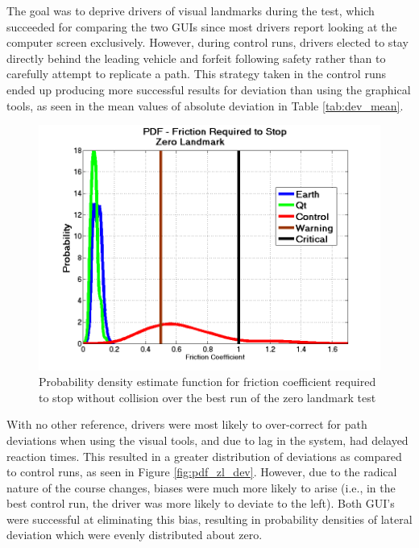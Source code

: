 \documentclass[twocolumn,10pt]{article}
\begin{document}
    The goal was to deprive drivers of visual landmarks during the test, which succeeded for comparing the two GUIs since most drivers report looking at the computer screen exclusively. However, during control runs, drivers elected to stay directly behind the leading vehicle and forfeit following safety rather than to carefully attempt to replicate a path. This strategy taken in the control runs ended up producing more successful results for deviation than using the graphical tools, as seen in the mean values of absolute deviation in Table \ref{tab:dev_mean}. 

    \begin{figure}[ht] \centering
      \includegraphics[width=\columnwidth]{../graphics/zero_landmark_mu_distribution.png}
      \caption{Probability density estimate function for friction coefficient required to stop without collision over the best run of the zero landmark test}
      \label{fig:pdf_zl_mu}
    \end{figure}

    With no other reference, drivers were most likely to over-correct for path deviations when using the visual tools, and due to lag in the system, had delayed reaction times. This resulted in a greater distribution of deviations as compared to control runs, as seen in Figure \ref{fig:pdf_zl_dev}. However, due to the radical nature of the course changes, biases were much more likely to arise (i.e., in the best control run, the driver was more likely to deviate to the left). Both GUI's were successful at eliminating this bias, resulting in probability densities of lateral deviation which were evenly distributed about zero.
\end{document}
